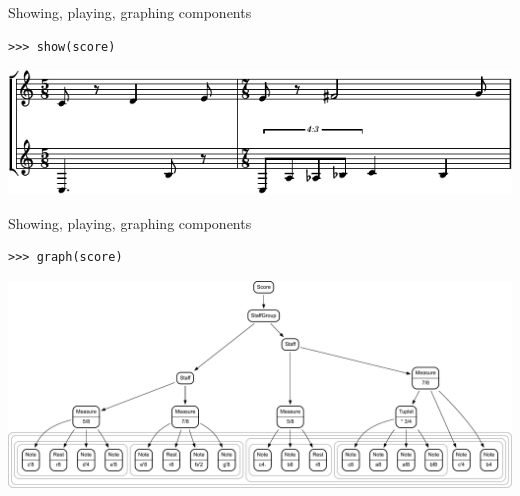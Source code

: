 \begin{frame}[fragile]{Showing, playing, graphing components}

\begin{abjadbookoutput}
\begin{singlespacing}
\vspace{-0.5\baselineskip}
\begin{verbatim}
>>> show(score)
\end{verbatim}
\noindent\includegraphics[max width=\textwidth,]{assets/lilypond-e3b1c40a4191d3949ecaa427d7f31b59.pdf}
\end{singlespacing}
\end{abjadbookoutput}

\end{frame}

\begin{frame}[fragile]{Showing, playing, graphing components}

\begin{abjadbookoutput}
\begin{singlespacing}
\vspace{-0.5\baselineskip}
\begin{verbatim}
>>> graph(score)
\end{verbatim}
\noindent\includegraphics[scale=0.4,max width=\textwidth,]{assets/graphviz-1aff8c1099414aebef04794943742f82.pdf}
\end{singlespacing}
\end{abjadbookoutput}

\end{frame}

